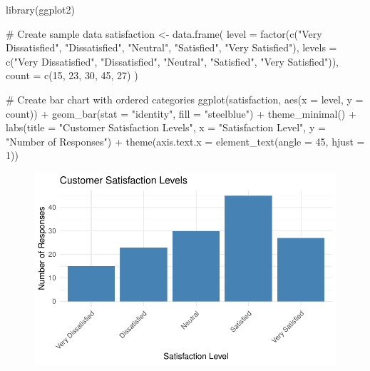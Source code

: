 \documentclass[
  letterpaper,
  DIV=11,
  numbers=noendperiod]{scrartcl}
\newenvironment{Shaded}{\begin{snugshade}}{\end{snugshade}}
\newcommand{\AttributeTok}[1]{\textcolor[rgb]{0.40,0.45,0.13}{#1}}
\newcommand{\CommentTok}[1]{\textcolor[rgb]{0.37,0.37,0.37}{#1}}
\newcommand{\DecValTok}[1]{\textcolor[rgb]{0.68,0.00,0.00}{#1}}
\newcommand{\FunctionTok}[1]{\textcolor[rgb]{0.28,0.35,0.67}{#1}}
\newcommand{\NormalTok}[1]{\textcolor[rgb]{0.00,0.23,0.31}{#1}}
\newcommand{\OtherTok}[1]{\textcolor[rgb]{0.00,0.23,0.31}{#1}}
\newcommand{\SpecialCharTok}[1]{\textcolor[rgb]{0.37,0.37,0.37}{#1}}
\newcommand{\StringTok}[1]{\textcolor[rgb]{0.13,0.47,0.30}{#1}}
\begin{document}
\begin{Shaded}
\begin{Highlighting}[]
\FunctionTok{library}\NormalTok{(ggplot2)}

\CommentTok{\# Create sample data}
\NormalTok{satisfaction }\OtherTok{\textless{}{-}} \FunctionTok{data.frame}\NormalTok{(}
  \AttributeTok{level =} \FunctionTok{factor}\NormalTok{(}\FunctionTok{c}\NormalTok{(}\StringTok{"Very Dissatisfied"}\NormalTok{, }\StringTok{"Dissatisfied"}\NormalTok{, }\StringTok{"Neutral"}\NormalTok{, }\StringTok{"Satisfied"}\NormalTok{, }\StringTok{"Very Satisfied"}\NormalTok{),}
                 \AttributeTok{levels =} \FunctionTok{c}\NormalTok{(}\StringTok{"Very Dissatisfied"}\NormalTok{, }\StringTok{"Dissatisfied"}\NormalTok{, }\StringTok{"Neutral"}\NormalTok{, }\StringTok{"Satisfied"}\NormalTok{, }\StringTok{"Very Satisfied"}\NormalTok{)),}
  \AttributeTok{count =} \FunctionTok{c}\NormalTok{(}\DecValTok{15}\NormalTok{, }\DecValTok{23}\NormalTok{, }\DecValTok{30}\NormalTok{, }\DecValTok{45}\NormalTok{, }\DecValTok{27}\NormalTok{)}
\NormalTok{)}

\CommentTok{\# Create bar chart with ordered categories}
\FunctionTok{ggplot}\NormalTok{(satisfaction, }\FunctionTok{aes}\NormalTok{(}\AttributeTok{x =}\NormalTok{ level, }\AttributeTok{y =}\NormalTok{ count)) }\SpecialCharTok{+}
  \FunctionTok{geom\_bar}\NormalTok{(}\AttributeTok{stat =} \StringTok{"identity"}\NormalTok{, }\AttributeTok{fill =} \StringTok{"steelblue"}\NormalTok{) }\SpecialCharTok{+}
  \FunctionTok{theme\_minimal}\NormalTok{() }\SpecialCharTok{+}
  \FunctionTok{labs}\NormalTok{(}\AttributeTok{title =} \StringTok{"Customer Satisfaction Levels"}\NormalTok{,}
       \AttributeTok{x =} \StringTok{"Satisfaction Level"}\NormalTok{,}
       \AttributeTok{y =} \StringTok{"Number of Responses"}\NormalTok{) }\SpecialCharTok{+}
  \FunctionTok{theme}\NormalTok{(}\AttributeTok{axis.text.x =} \FunctionTok{element\_text}\NormalTok{(}\AttributeTok{angle =} \DecValTok{45}\NormalTok{, }\AttributeTok{hjust =} \DecValTok{1}\NormalTok{))}
\end{Highlighting}
\end{Shaded}

\begin{figure}[H]

{\centering \includegraphics{Ordinal_data_an_R_files/figure-pdf/unnamed-chunk-1-1.pdf}

}

\end{figure}
\end{document}
